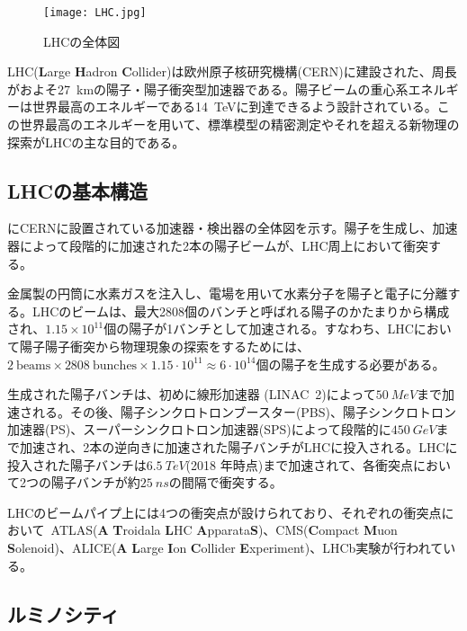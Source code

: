 \begin{figure}[tbp]
  \centering
  \texttt{[image: LHC.jpg]}
  \caption[LHCの全体図]{LHCの全体図 \cite{LHC} }
  \label{fig:LHC}
\end{figure}


LHC(\textbf{L}arge \textbf{H}adron \textbf{C}ollider)は欧州原子核研究機構(CERN)に建設された、周長がおよそ27\ \si{km}の陽子・陽子衝突型加速器である。陽子ビームの重心系エネルギーは世界最高のエネルギーである14\ \si{TeV}に到達できるよう設計されている。この世界最高のエネルギーを用いて、標準模型の精密測定やそれを超える新物理の探索がLHCの主な目的である。

\subsection{LHCの基本構造}
にCERNに設置されている加速器・検出器の全体図を示す。陽子を生成し、加速器によって段階的に加速された2本の陽子ビームが、LHC周上において衝突する。


金属製の円筒に水素ガスを注入し、電場を用いて水素分子を陽子と電子に分離する。LHCのビームは、最大2808個のバンチと呼ばれる陽子のかたまりから構成され、$1.15\times 10^{11}$個の陽子が1バンチとして加速される。すなわち、LHCにおいて陽子陽子衝突から物理現象の探索をするためには、$2\ \mathrm{beams} \times 2808\ \mathrm{bunches}\times 1.15\cdot10^{11}\approx 6\cdot 10^{14}$個の陽子を生成する必要がある。

生成された陽子バンチは、初めに線形加速器 (LINAC\ 2)によって$50\ \si{MeV}$まで加速される。その後、陽子シンクロトロンブースター(PBS)、陽子シンクロトロン加速器(PS)、スーパーシンクロトロン加速器(SPS)によって段階的に$450\ \si{GeV}$まで加速され、2本の逆向きに加速された陽子バンチがLHCに投入される。LHCに投入された陽子バンチは$6.5\ \si{TeV}$(2018 年時点)まで加速されて、各衝突点において2つの陽子バンチが約$25\ \si{ns}$の間隔で衝突する。

LHCのビームパイプ上には4つの衝突点が設けられており、それぞれの衝突点において\ ATLAS(\textbf{A} \textbf{T}roidala \textbf{L}HC \textbf{A}pparata\textbf{S})、CMS(\textbf{C}ompact \textbf{M}uon \textbf{S}olenoid)、ALICE(\textbf{A} \textbf{L}arge \textbf{I}on \textbf{C}ollider \textbf{E}xperiment)、LHCb実験が行われている。




\subsection{ルミノシティ}
\label{sec:luminosity}


